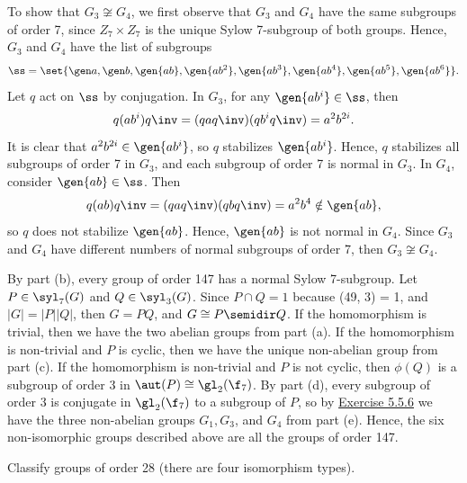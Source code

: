 \begin{solalph}
    \item To show that $G_3 \not\cong G_4$, we first observe that $G_3$ and $G_4$ have the same subgroups of order 7, since $Z_7 \times Z_7$ is the unique Sylow 7-subgroup of both groups. Hence, $G_3$ and $G_4$ have the list of subgroups
    \[\ss = \set{\gen a, \gen b, \gen{ab}, \gen{ab^2}, \gen{ab^3}, \gen{ab^4}, \gen{ab^5}, \gen{ab^6}}.\]
    Let $q$ act on $\ss$ by conjugation. In $G_3$, for any $\gen{ab^i} \in \ss$, then
    \[q(ab^i)q\inv = (qaq\inv)(qb^iq\inv) = a^2b^{2i}.\]
    It is clear that $a^2b^{2i} \in \gen{ab^i}$, so $q$ stabilizes $\gen{ab^i}$. Hence, $q$ stabilizes all subgroups of order 7 in $G_3$, and each subgroup of order 7 is normal in $G_3$. In $G_4$, consider $\gen{ab} \in \ss$. Then
    \[q(ab)q\inv = (qaq\inv)(qbq\inv) = a^2b^4 \notin \gen{ab},\]
    so $q$ does not stabilize $\gen{ab}$. Hence, $\gen{ab}$ is not normal in $G_4$. Since $G_3$ and $G_4$ have different numbers of normal subgroups of order 7, then $G_3 \not\cong G_4$.
    \item By part (b), every group of order 147 has a normal Sylow 7-subgroup. Let $P \in \syl_7(G)$ and $Q \in \syl_3(G)$. Since $P \cap Q = 1$ because (49, 3) = 1, and $|G| = |P||Q|$, then $G = PQ$, and $G \cong P \semidir Q$. If the homomorphism is trivial, then we have the two abelian groups from part (a). If the homomorphism is non-trivial and $P$ is cyclic, then we have the unique non-abelian group from part (c). If the homomorphism is non-trivial and $P$ is not cyclic, then $\phi(Q)$ is a subgroup of order 3 in $\aut(P) \cong \gl_2(\f_7)$. By part (d), every subgroup of order 3 is conjugate in $\gl_2(\f_7)$ to a subgroup of $P$, so by \hyperref[ex5.5.6]{Exercise 5.5.6} we have the three non-abelian groups $G_1, G_3$, and $G_4$ from part (e). Hence, the six non-isomorphic groups described above are all the groups of order 147.
\end{solalph}

\begin{exercise}\label{ex5.5.11}
    Classify groups of order 28 (there are four isomorphism types).
\end{exercise}

